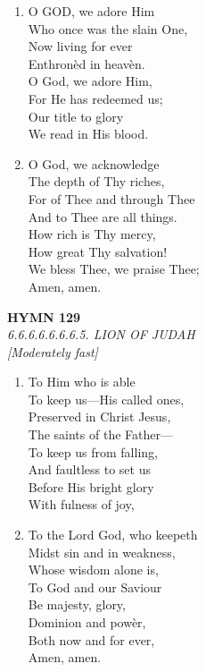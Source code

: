 \documentclass[11pt,a4paper]{article}
\begin{document}
\begin{enumerate}
    \item O GOD, we adore Him \\
        Who once was the slain One, \\
        Now living for ever \\
        Enthron\`ed in heav\`en. \\
        O God, we adore Him, \\
        For He has redeemed us; \\
        Our title to glory \\
        We read in His blood.

    \item O God, we acknowledge \\
        The depth of Thy riches, \\
        For of Thee and through Thee \\
        And to Thee are all things. \\
        How rich is Thy mercy, \\
        How great Thy salvation! \\
        We bless Thee, we praise Thee; \\
        Amen, amen.

\end{enumerate}

\newpage
\begin{center}
    {\Large \textbf{HYMN 129}}
    \\
    \textit{6.6.6.6.6.6.6.5. LION OF JUDAH}
    \\
    \textit{\small [Moderately fast]}
\end{center}
\vspace{1em}

\begin{enumerate}
    \item To Him who is able \\
        To keep us---His called ones, \\
        Preserved in Christ Jesus, \\
        The saints of the Father--- \\
        To keep us from falling, \\
        And faultless to set us \\
        Before His bright glory \\
        With fulness of joy,

    \item To the Lord God, who keepeth \\
        Midst sin and in weakness, \\
        Whose wisdom alone is, \\
        To God and our Saviour \\
        Be majesty, glory, \\
        Dominion and pow\`er, \\
        Both now and for ever, \\
        Amen, amen.

\end{enumerate}
\end{document}
